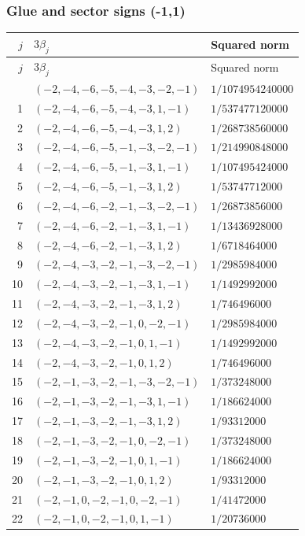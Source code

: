 \subsubsection{Glue and sector signs (-1,1)}

\begingroup\scriptsize
\setlength{\tabcolsep}{5pt}
\begin{longtable}{@{}rll@{}}
\toprule
$j$ & $3\beta_j$ & Squared norm\\
\midrule\endfirsthead
\toprule
$j$ & $3\beta_j$ & Squared norm\\
\midrule\endhead
\bottomrule\endfoot
0 & $(-2,-4,-6,-5,-4,-3,-2,-1)$ & $1/1074954240000$\\
1 & $(-2,-4,-6,-5,-4,-3,1,-1)$ & $1/537477120000$\\
2 & $(-2,-4,-6,-5,-4,-3,1,2)$ & $1/268738560000$\\
3 & $(-2,-4,-6,-5,-1,-3,-2,-1)$ & $1/214990848000$\\
4 & $(-2,-4,-6,-5,-1,-3,1,-1)$ & $1/107495424000$\\
5 & $(-2,-4,-6,-5,-1,-3,1,2)$ & $1/53747712000$\\
6 & $(-2,-4,-6,-2,-1,-3,-2,-1)$ & $1/26873856000$\\
7 & $(-2,-4,-6,-2,-1,-3,1,-1)$ & $1/13436928000$\\
8 & $(-2,-4,-6,-2,-1,-3,1,2)$ & $1/6718464000$\\
9 & $(-2,-4,-3,-2,-1,-3,-2,-1)$ & $1/2985984000$\\
10 & $(-2,-4,-3,-2,-1,-3,1,-1)$ & $1/1492992000$\\
11 & $(-2,-4,-3,-2,-1,-3,1,2)$ & $1/746496000$\\
12 & $(-2,-4,-3,-2,-1,0,-2,-1)$ & $1/2985984000$\\
13 & $(-2,-4,-3,-2,-1,0,1,-1)$ & $1/1492992000$\\
14 & $(-2,-4,-3,-2,-1,0,1,2)$ & $1/746496000$\\
15 & $(-2,-1,-3,-2,-1,-3,-2,-1)$ & $1/373248000$\\
16 & $(-2,-1,-3,-2,-1,-3,1,-1)$ & $1/186624000$\\
17 & $(-2,-1,-3,-2,-1,-3,1,2)$ & $1/93312000$\\
18 & $(-2,-1,-3,-2,-1,0,-2,-1)$ & $1/373248000$\\
19 & $(-2,-1,-3,-2,-1,0,1,-1)$ & $1/186624000$\\
20 & $(-2,-1,-3,-2,-1,0,1,2)$ & $1/93312000$\\
21 & $(-2,-1,0,-2,-1,0,-2,-1)$ & $1/41472000$\\
22 & $(-2,-1,0,-2,-1,0,1,-1)$ & $1/20736000$\\

\end{longtable}
